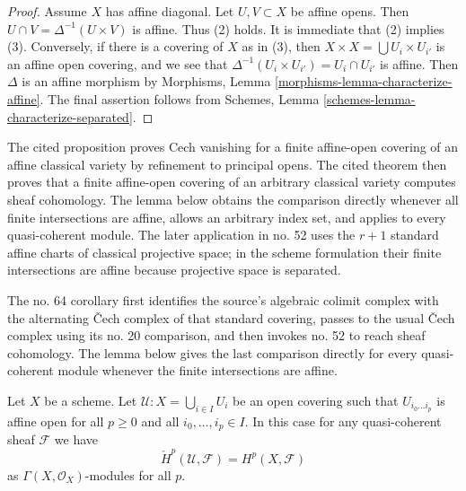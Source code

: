 \begin{proof}
Assume $X$ has affine diagonal. Let $U, V \subset X$ be affine opens.
Then $U \cap V = \Delta^{-1}(U \times V)$ is affine. Thus (2) holds.
It is immediate that (2) implies (3). Conversely, if there is a
covering of $X$ as in (3), then $X \times X = \bigcup U_i \times U_{i'}$
is an affine open covering, and we see that
$\Delta^{-1}(U_i \times U_{i'}) = U_i \cap U_{i'}$
is affine. Then $\Delta$ is an affine morphism by
Morphisms, Lemma \ref{morphisms-lemma-characterize-affine}.
The final assertion follows from Schemes, Lemma
\ref{schemes-lemma-characterize-separated}.
\end{proof}

\begin{lemma}
\label{lemma-cech-cohomology-quasi-coherent}
\begin{reference}
\cite[Chapter II, \S 3, no. 47, Proposition 8 and Theorem 4,
pp. 239--240]{FAC}
\cite[Chapter III, \S 1, no. 52, Proposition 2, p. 244]{FAC}
\cite[Chapter III, \S 3, no. 64, Corollary, p. 258]{FAC}
\end{reference}
\begin{history}
The cited proposition proves Cech vanishing for a finite affine-open covering
of an affine classical variety by refinement to principal opens. The cited
theorem then proves that a finite affine-open covering of an arbitrary
classical variety computes sheaf cohomology. The lemma below obtains the
comparison directly whenever all finite intersections are affine, allows an
arbitrary index set, and applies to every quasi-coherent module. The later
application in no. 52 uses the $r + 1$ standard affine charts of classical
projective space; in the scheme formulation their finite intersections are
affine because projective space is separated.

The no. 64 corollary first identifies the source's algebraic colimit complex
with the alternating {\v C}ech complex of that standard covering, passes to
the usual {\v C}ech complex using its no. 20 comparison, and then invokes
no. 52 to reach sheaf cohomology. The lemma below gives the last comparison
directly for every quasi-coherent module whenever the finite intersections
are affine.
\end{history}
Let $X$ be a scheme.
Let $\mathcal{U} : X = \bigcup_{i \in I} U_i$ be an open covering such that
$U_{i_0 \ldots i_p}$ is affine open for all $p \ge 0$ and all
$i_0, \ldots, i_p \in I$.
In this case for any quasi-coherent sheaf $\mathcal{F}$ we have
$$
\check{H}^p(\mathcal{U}, \mathcal{F}) = H^p(X, \mathcal{F})
$$
as $\Gamma(X, \mathcal{O}_X)$-modules for all $p$.
\end{lemma}

